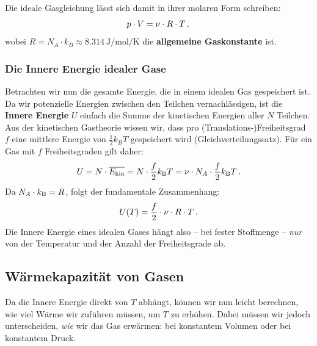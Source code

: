 \noindent Die ideale Gasgleichung lässt sich damit in ihrer molaren Form schreiben:
\begin{equation}\label{eq:ideale_gasgleichung_molar}
    p \cdot V = \nu \cdot R \cdot T \,{,}\,
\end{equation}
wobei $R = N_A \cdot k_B \approx \SI{8.314}{\joule\per\mol\per\kelvin}$ die \textbf{allgemeine Gaskonstante} ist.

\subsubsection{Die Innere Energie idealer Gase}
Betrachten wir nun die gesamte Energie, die in einem idealen Gas gespeichert ist. Da wir potenzielle Energien zwischen den Teilchen vernachlässigen, ist die \textbf{Innere Energie} $U$ einfach die Summe der kinetischen Energien aller $N$ Teilchen.
Aus der kinetischen Gastheorie wissen wir, dass pro (Translations-)Freiheitsgrad $f$ eine mittlere Energie von $\frac{1}{2}k_B T$ gespeichert wird (Gleichverteilungssatz).
Für ein Gas mit $f$ Freiheitsgraden gilt daher:
\begin{equation}
    U = N \cdot \overline{E_\mathrm{kin}} = N \cdot \frac{f}{2} k_{\mathrm{B}} T = \nu \cdot N_A \cdot \frac{f}{2} k_{\mathrm{B}} T \,.
\end{equation}
Da $N_A \cdot k_{\mathrm{B}} = R$, folgt der fundamentale Zusammenhang:
\begin{equation}\label{eq: innere_energie_f}
    U(T) = \frac{f}{2} \cdot \nu \cdot R \cdot T \,.
\end{equation}
Die Innere Energie eines idealen Gases hängt also -- bei fester Stoffmenge -- \textit{nur} von der Temperatur und der Anzahl der Freiheitsgrade ab.

\subsection{Wärmekapazität von Gasen}\label{subsec: waermekapazitaet_gase}
Da die Innere Energie direkt von $T$ abhängt, können wir nun leicht berechnen, wie viel Wärme wir zuführen müssen, um $T$ zu erhöhen. Dabei müssen wir jedoch unterscheiden, \textit{wie} wir das Gas erwärmen: bei konstantem Volumen oder bei konstantem Druck.

